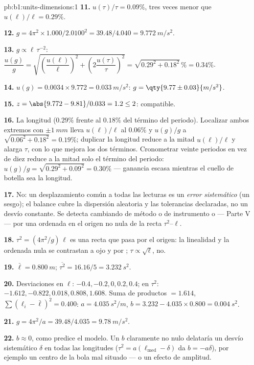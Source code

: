 \begin{solution}{pb:b1:units-dimensions:1}
\textbf{11.} $u(\tau)/\tau = 0.09\%$, tres veces menor que
$u(\ell)/\ell = 0.29\%$.

\textbf{12.} $g = 4\pi^2 \times 1.000/2.0100^2 = 39.48/4.040 =
\qty{9.772}{m/s^2}$.

\textbf{13.} $g \propto \ell\,\tau^{-2}$:
$\dfrac{u(g)}{g} = \sqrt{\left(\dfrac{u(\ell)}{\ell}\right)^2
+ \left(2\dfrac{u(\tau)}{\tau}\right)^2} = \sqrt{0.29^2 + 0.18^2}\,\%
= 0.34\%$.

\textbf{14.} $u(g) = 0.0034 \times 9.772 = \qty{0.033}{m/s^2}$:
$g = \qty{9.77\pm0.03}{m/s^2}$.

\textbf{15.} $z = \abs{9.772 - 9.81}/0.033 = 1.2 \leq 2$: compatible.

\textbf{16.} La longitud ($0.29\%$ frente al $0.18\%$ del término del
periodo). Localizar ambos extremos con $\pm\qty{1}{mm}$ lleva
$u(\ell)/\ell$ al $0.06\%$ y $u(g)/g$ a $\sqrt{0.06^2 + 0.18^2} = 0.19\%$;
duplicar la longitud reduce a la mitad $u(\ell)/\ell$ y alarga $\tau$,
con lo que mejora los dos términos. Cronometrar veinte periodos en vez
de diez reduce a la mitad solo el término del periodo:
$u(g)/g = \sqrt{0.29^2 + 0.09^2} = 0.30\%$ --- ganancia escasa mientras
el cuello de botella sea la longitud.

\textbf{17.} No: un desplazamiento común a todas las lecturas es un
\emph{error sistemático} (un sesgo); el balance cubre la dispersión
aleatoria y las tolerancias declaradas, no un desvío constante. Se
detecta cambiando de método o de instrumento o --- Parte V --- por una
ordenada en el origen no nula de la recta $\tau^2$--$\ell$.

\textbf{18.} $\tau^2 = (4\pi^2/g)\,\ell$ es una recta que pasa por el
origen: la linealidad y la ordenada nula se contrastan a ojo y por
; $\tau \propto \sqrt\ell$, no.

\textbf{19.} $\bar\ell = \qty{0.800}{m}$; $\overline{\tau^2} = 16.16/5 =
\qty{3.232}{s^2}$.

\textbf{20.} Desviaciones en $\ell$: $-0.4, -0.2, 0, 0.2, 0.4$; en
$\tau^2$: $-1.612, -0.822, 0.018, 0.808, 1.608$. Suma de productos $= 1.614$,
$\sum(\ell_i - \bar\ell)^2 = 0.400$: $a = \qty{4.035}{s^2/m}$,
$b = 3.232 - 4.035 \times 0.800 = \qty{0.004}{s^2}$.

\textbf{21.} $g = 4\pi^2/a = 39.48/4.035 = \qty{9.78}{m/s^2}$.

\textbf{22.} $b \approx 0$, como predice el modelo. Un $b$ claramente no
nulo delataría un desvío sistemático $\delta$ en todas las longitudes
($\tau^2 = a(\ell_{\text{med}} - \delta)$ da $b = -a\delta$), por
ejemplo un centro de la bola mal situado --- o un efecto de amplitud.


\end{solution}
